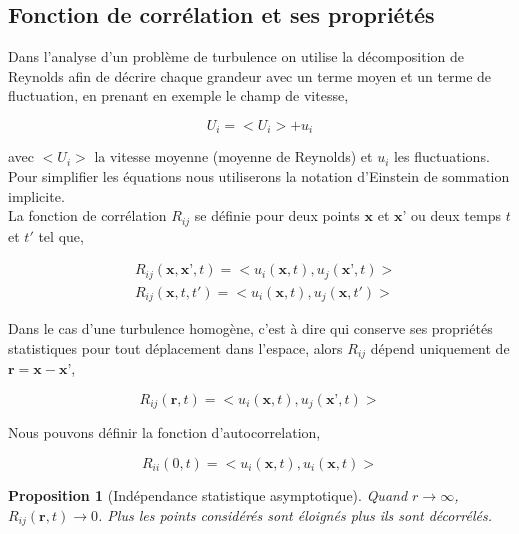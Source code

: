 \documentclass[12pt]{article}
\theoremstyle{plain}
\newtheorem{proposition}[theorem]{Proposition}
\theoremstyle{remark}
\begin{document}
	\subsection{Fonction de corrélation et ses propriétés}
		
		Dans l'analyse d'un problème de turbulence on utilise la décomposition de Reynolds afin de décrire chaque grandeur avec un terme moyen et un terme de fluctuation, en prenant en exemple le champ de vitesse, 
		
		\begin{equation}
			U_i=<U_i> + u_i 	
		\end{equation}
	
		avec $<U_i>$ la vitesse moyenne (moyenne de Reynolds) et $u_i$ les fluctuations. \\
		Pour simplifier les équations nous utiliserons la notation d'Einstein de sommation implicite. \\
		La fonction de corrélation $R_{ij}$ se définie pour deux points $\textbf{x}$ et $\textbf{x'}$ ou deux temps $t$ et $t'$  tel que,
		
		\begin{equation}
		\begin{split}
			&R_{ij}(\textbf{x},\textbf{x'},t) = <u_i(\textbf{x},t), u_j(\textbf{x'},t)> \\
			&R_{ij}(\textbf{x},t,t') = <u_i(\textbf{x},t), u_j(\textbf{x},t')>
		\end{split}
		\end{equation}
	
		Dans le cas d'une turbulence homogène, c'est à dire qui conserve ses propriétés statistiques pour tout déplacement dans l'espace, alors $R_{ij}$ dépend uniquement de $\textbf{r}=\textbf{x}-\textbf{x'}$,
		
		\begin{equation}
			R_{ij}(\textbf{r},t) = <u_i(\textbf{x},t), u_j(\textbf{x'},t)>
			\label{eq:correlation}
		\end{equation}
	
		Nous pouvons définir la fonction d'autocorrelation,
		
		\begin{equation}
			R_{ii}(0,t) = <u_i(\textbf{x},t), u_i(\textbf{x},t)>
		\end{equation}
	
		\begin{proposition}[Indépendance statistique asymptotique]
			Quand $r\rightarrow\infty$, $R_{ij}(\textbf{r},t)\rightarrow0$. Plus les points considérés sont éloignés plus ils sont décorrélés.
		\end{proposition}
	
\end{document}

